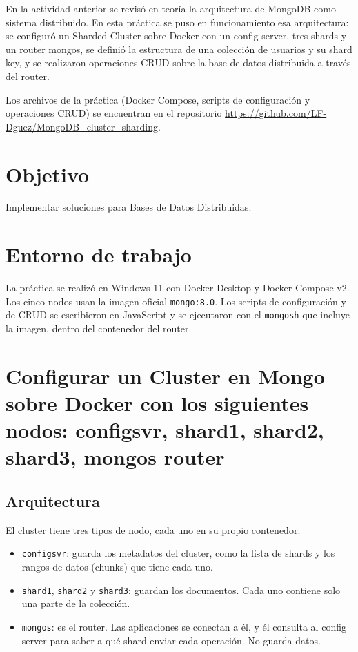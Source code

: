 \documentclass[12pt]{article}
\begin{document}
En la actividad anterior se revisó en teoría la arquitectura de MongoDB como sistema distribuido. En esta práctica se puso en funcionamiento esa arquitectura: se configuró un Sharded Cluster sobre Docker con un config server, tres shards y un router mongos, se definió la estructura de una colección de usuarios y su shard key, y se realizaron operaciones CRUD sobre la base de datos distribuida a través del router.

Los archivos de la práctica (Docker Compose, scripts de configuración y operaciones CRUD) se encuentran en el repositorio \url{https://github.com/LF-Dguez/MongoDB_cluster_sharding}.

\section{Objetivo}

Implementar soluciones para Bases de Datos Distribuidas.

\section{Entorno de trabajo}

La práctica se realizó en Windows 11 con Docker Desktop y Docker Compose v2. Los cinco nodos usan la imagen oficial \texttt{mongo:8.0}. Los scripts de configuración y de CRUD se escribieron en JavaScript y se ejecutaron con el \texttt{mongosh} que incluye la imagen, dentro del contenedor del router.

\section{Configurar un Cluster en Mongo sobre Docker con los siguientes nodos: configsvr, shard1, shard2, shard3, mongos router}

\subsection{Arquitectura}

El cluster tiene tres tipos de nodo, cada uno en su propio contenedor:

\begin{itemize}[itemsep=2pt, topsep=4pt]
    \item \texttt{configsvr}: guarda los metadatos del cluster, como la lista de shards y los rangos de datos (chunks) que tiene cada uno.
    \item \texttt{shard1}, \texttt{shard2} y \texttt{shard3}: guardan los documentos. Cada uno contiene solo una parte de la colección.
    \item \texttt{mongos}: es el router. Las aplicaciones se conectan a él, y él consulta al config server para saber a qué shard enviar cada operación. No guarda datos.
\end{itemize}
\end{document}
